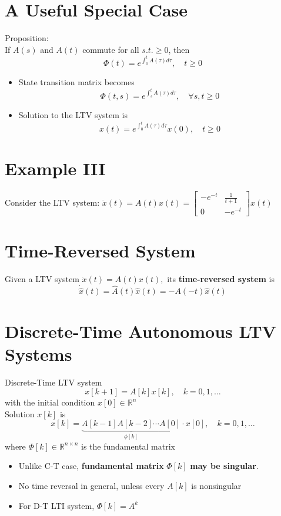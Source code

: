 \documentclass[10pt,a4paper,oneside]{article}
\begin{document}
\section{A Useful Special Case}
Proposition:\\
If $A(s)$ and $A(t)$ commute for all $s.t.\geq0$, then
\[
\Phi(t)=e^{\int_{0}^{t} A(\tau) d \tau}, \quad t \geq 0
\]
\begin{itemize}
\item State transition matrix becomes
\[
\Phi(t, s)=e^{\int_{s}^{t} A(\tau) d \tau}, \quad \forall s, t \geq 0
\]
\item Solution to the LTV system is
\[
x(t)=e^{\int_{0}^{t} A(\tau) d \tau} x(0), \quad t \geq 0
\]
\end{itemize}
\section{Example III}
Consider the LTV system: $\dot{x}(t)=A(t) x(t)=\left[\begin{array}{cc}{-e^{-t}} & {\frac{1}{t+1}} \\ {0} & {-e^{-t}}\end{array}\right] x(t)$
\section{Time-Reversed System}
Given a LTV system $\dot{x}(t)=A(t) x(t),$ its {\bfseries time-reversed system} is
\[
\dot{\hat{x}}(t)=\hat{A}(t) \hat{x}(t)=-A(-t) \hat{x}(t)
\]
\section{Discrete-Time Autonomous LTV Systems}
Discrete-Time LTV system
\[
x[k+1]=A[k] x[k], \quad k=0,1, \ldots
\]
with the initial condition $x[0] \in \mathbb{R}^{n}$\\
Solution $x[k]$ is
\[
x[k]=\underbrace{A[k-1] A[k-2] \cdots A[0]}_{\phi[k]} \cdot x[0], \quad k=0,1, \ldots
\]
where $\Phi[k] \in \mathbb{R}^{n \times n}$ is the fundamental matrix
\begin{itemize}
\item Unlike C-T case, {\bfseries fundamental matrix} $\Phi[k]$ {\bfseries may be singular}.
\item No time reversal in general, unless every $A[k]$ is nonsingular
\item For D-T LTI system, $\Phi[k]=A^{k}$
\end{itemize}
\end{document}
